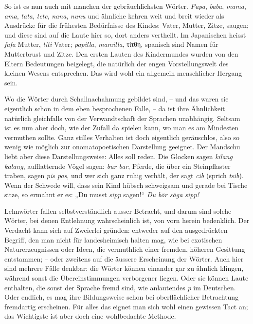 So ist es nun auch mit manchen der gebräuchlichsten Wörter. \textit{Papa}, \textit{baba}, \textit{mama}, \textit{ama}, \textit{tata}, \textit{tete}, \textit{nana}, \textit{nunu} und ähnliche kehren weit und breit wieder als Ausdrücke für die frühesten Bedürfnisse des Kindes: Vater, Mutter, Zitze, saugen; und diese  sind auf die Laute hier so, dort anders vertheilt. Im Japanischen heisst \textit{fafa}  Mutter, \textit{titi} Vater; \textit{papilla}, \textit{mamilla}, τίτθη, spanisch \label{fp.164}   sind Namen für Mutterbrust \label{sp.154} und Zitze. Den ersten Lauten des Kindermundes wurden von den Eltern Bedeutungen beigelegt, die natürlich der engen Vorstellungswelt des kleinen Wesens entsprechen. Das wird wohl ein allgemein menschlicher Hergang sein.

Wo die Wörter durch Schallnachahmung gebildet sind, – und das waren sie eigentlich schon in dem eben besprochenen Falle, – da ist ihre Ähnlichkeit natürlich gleichfalls von der Verwandtschaft der Sprachen unabhängig. Seltsam ist es nun aber doch, wie der Zufall da spielen kann, wo man es am Mindesten vermuthen sollte. Ganz stilles Verhalten ist doch eigentlich geräuschlos, also so wenig wie möglich zur onomatopoetischen Darstellung geeignet. Der Mandschu liebt aber diese Darstellungsweise: Alles soll reden. Die Glocken sagen \textit{kilang kalang}, aufflatternde Vögel sagen: \textit{bur bar}, Pferde, die über ein Steinpflaster traben, sagen \textit{pis pas}, und wer sich ganz ruhig verhält, der sagt \textit{cib} (sprich \textit{tsib}). Wenn der Schwede will, dass sein Kind hübsch schweigsam und gerade bei Tische sitze, so ermahnt er es: „Du musst \textit{sipp} sagen!“ \textit{Du bör säga sipp!} 

Lehnwörter fallen selbstverständlich ausser Betracht, und darum sind solche Wörter, bei denen Entlehnung wahrscheinlich ist, von vorn herein bedenklich. Der Verdacht kann sich auf Zweierlei gründen: entweder auf den ausgedrückten Begriff, den man nicht für landesheimisch halten mag, wie bei exotischen Naturerzeugnissen oder Ideen, die vermuthlich einer fremden, höheren Gesittung entstammen; – oder zweitens auf die äussere Erscheinung der Wörter. Auch hier sind mehrere Fälle denkbar: die Wörter können einander gar zu ähnlich klingen, während sonst die Übereinstimmungen verborgener liegen. Oder sie können Laute enthalten, die sonst der Sprache fremd sind, wie anlautendes \textit{p} im Deutschen. Oder endlich, es mag ihre Bildungsweise schon bei oberflächlicher Betrachtung fremdartig erscheinen. Für alles das eignet man sich wohl einen gewissen Tact an; das Wichtigste ist aber doch eine wohlbedachte Methode.

